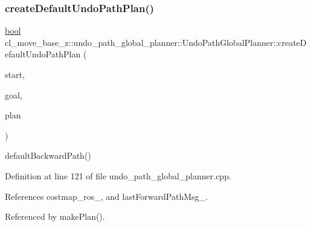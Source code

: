 \subsubsection{\texorpdfstring{create\+Default\+Undo\+Path\+Plan()}{createDefaultUndoPathPlan()}}
{\footnotesize\ttfamily \hyperlink{classbool}{bool} cl\+\_\+move\+\_\+base\+\_\+z\+::undo\+\_\+path\+\_\+global\+\_\+planner\+::\+Undo\+Path\+Global\+Planner\+::create\+Default\+Undo\+Path\+Plan (\begin{DoxyParamCaption}\item[{const geometry\+\_\+msgs\+::\+Pose\+Stamped \&}]{start,  }\item[{const geometry\+\_\+msgs\+::\+Pose\+Stamped \&}]{goal,  }\item[{std\+::vector$<$ geometry\+\_\+msgs\+::\+Pose\+Stamped $>$ \&}]{plan }\end{DoxyParamCaption})\hspace{0.3cm}{\ttfamily [virtual]}}

default\+Backward\+Path() 

Definition at line 121 of file undo\+\_\+path\+\_\+global\+\_\+planner.\+cpp.



References costmap\+\_\+ros\+\_\+, and last\+Forward\+Path\+Msg\+\_\+.



Referenced by make\+Plan().


